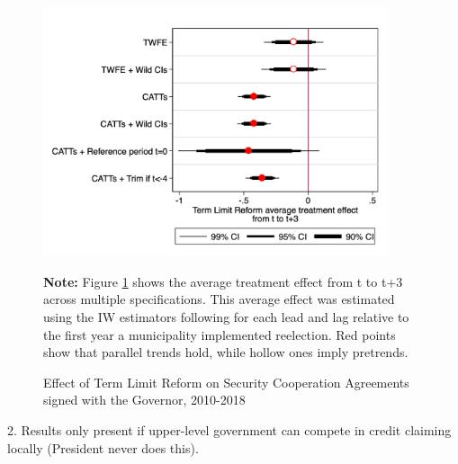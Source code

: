 \documentclass[12pt]{amsart}
\numberwithin{equation}{section}
\theoremstyle{definition}
\theoremstyle{definition}
\theoremstyle{definition}
\begin{document}
\begin{figure}[H]   
\centering
 \caption{Effect of Term Limit Reform on Security Cooperation Agreements signed with the Governor, 2010-2018}
 \label{fig:robustness_agreements}
\includegraphics[width=0.9\textwidth]{../Figures/average_effects.png}
       \captionsetup{justification=centering}
       
 \textbf{Note:} Figure \ref{fig:robustness_agreements} shows the average treatment effect from t to t+3 across multiple specifications. This average effect was estimated using the IW estimators following \citet{abraham_sun_2020} for each lead and lag relative to the first year a municipality implemented reelection. Red points show that parallel trends hold, while hollow ones imply pretrends. 
\end{figure}   

2. Results only present if upper-level government can compete in credit claiming locally (President never does this). 
\end{document}
